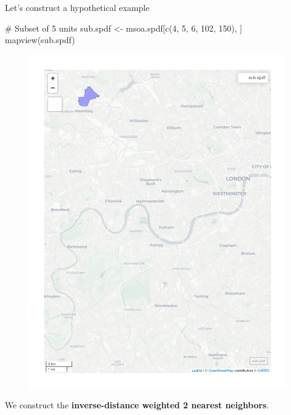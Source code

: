 \documentclass[
  letterpaper,
  DIV=11,
  numbers=noendperiod]{scrreprt}
\newenvironment{Shaded}{\begin{snugshade}}{\end{snugshade}}
\newcommand{\CommentTok}[1]{\textcolor[rgb]{0.37,0.37,0.37}{#1}}
\newcommand{\DecValTok}[1]{\textcolor[rgb]{0.68,0.00,0.00}{#1}}
\newcommand{\FunctionTok}[1]{\textcolor[rgb]{0.28,0.35,0.67}{#1}}
\newcommand{\NormalTok}[1]{\textcolor[rgb]{0.00,0.23,0.31}{#1}}
\newcommand{\OtherTok}[1]{\textcolor[rgb]{0.00,0.23,0.31}{#1}}
\begin{document}
Let's construct a hypothetical example

\begin{Shaded}
\begin{Highlighting}[]
\CommentTok{\# Subset of 5 units}
\NormalTok{sub.spdf }\OtherTok{\textless{}{-}}\NormalTok{ msoa.spdf[}\FunctionTok{c}\NormalTok{(}\DecValTok{4}\NormalTok{, }\DecValTok{5}\NormalTok{, }\DecValTok{6}\NormalTok{, }\DecValTok{102}\NormalTok{, }\DecValTok{150}\NormalTok{), ]}
\FunctionTok{mapview}\NormalTok{(sub.spdf)}
\end{Highlighting}
\end{Shaded}

\begin{figure}[H]

{\centering \includegraphics{03_weights_files/figure-pdf/unnamed-chunk-13-1.pdf}

}

\end{figure}

We construct the \textbf{inverse-distance weighted 2 nearest neighbors}.
\end{document}
